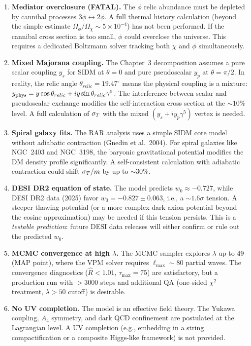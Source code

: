 \begin{enumerate}
\item \textbf{Mediator overclosure (FATAL).}
      The $\phi$ relic abundance must be depleted by cannibal processes
      $3\phi \leftrightarrow 2\phi$. A full thermal history calculation
      (beyond the simple estimate $\Omega_\phi/\Omega_\chi \sim 5\times10^{-4}$)
      has not been performed. If the cannibal cross section is too small,
      $\phi$ could overclose the universe. This requires a dedicated
      Boltzmann solver tracking both $\chi$ and $\phi$ simultaneously.

\item \textbf{Mixed Majorana coupling.}
      The Chapter~3 decomposition assumes a pure scalar coupling $y_s$ for
      SIDM at $\theta = 0$ and pure pseudoscalar $y_p$ at $\theta = \pi/2$.
      In reality, the relic angle $\theta_{relic} = 19.47^\circ$ means the
      physical coupling is a mixture:
      $y_{\rm phys} = y\cos\theta_{relic} + iy\sin\theta_{relic}\gamma^5$.
      The interference between scalar and pseudoscalar exchange modifies
      the self-interaction cross section at the $\sim 10\%$ level. A full
      calculation of $\sigma_T$ with the mixed $(y_s + iy_p\gamma^5)$ vertex
      is needed.

\item \textbf{Spiral galaxy fits.}
      The RAR analysis uses a simple SIDM core model without adiabatic
      contraction (Gnedin et al.~2004). For spiral galaxies like NGC~2403
      and NGC~3198, the baryonic gravitational potential modifies the DM
      density profile significantly. A self-consistent calculation with
      adiabatic contraction could shift $\sigma_T/m$ by up to $\sim 30\%$.

\item \textbf{DESI DR2 equation of state.}
      The model predicts $w_0 \approx -0.727$, while DESI DR2 data
      (2025) favor $w_0 = -0.827 \pm 0.063$, i.e., a $\sim 1.6\sigma$ tension.
      A steeper thawing potential (or a more complex dark axion potential beyond
      the cosine approximation) may be needed if this tension persists. This is
      a \emph{testable prediction}: future DESI data releases will either confirm
      or rule out the predicted $w_0$.

\item \textbf{MCMC convergence at high $\lambda$.}
      The MCMC sampler explores $\lambda$ up to 49 (MAP point), where
      the VPM solver requires $\ell_{\max} \sim 80$ partial waves. The
      convergence diagnostics ($\hat{R} < 1.01$, $\tau_{\max} = 75$) are
      satisfactory, but a production run with $> 3000$ steps and additional
      QA (one-sided $\chi^2$ treatment, $\lambda > 50$ cutoff) is desirable.

\item \textbf{No UV completion.}
      The model is an effective field theory. The Yukawa coupling, $A_4$
      symmetry, and dark QCD confinement are postulated at the Lagrangian level.
      A UV completion (e.g., embedding in a string compactification or a
      composite Higgs-like framework) is not provided.
\end{enumerate}

